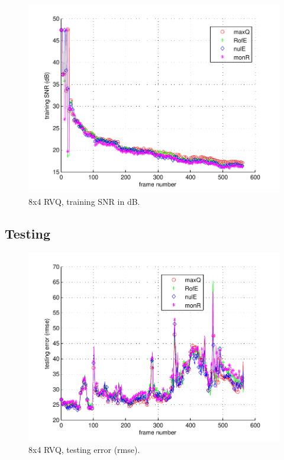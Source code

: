 								\begin{figure}[h!]
								\centering
								\includegraphics[height=0.4\textheight]{thesis/1_Dudek_8_4_1000_trg_SNRdB.pdf}
								\caption{8x4 RVQ, training SNR in dB.}
								\label{fig:1_Dudek_8_4_1000_trg_SNRdB}
								\end{figure}
\clearpage
\newpage
\subsection{Testing}
								\begin{figure}[h!]
								\centering
								\includegraphics[height=0.4\textheight]{thesis/1_Dudek_8_4_1000_tst_rmse.pdf}
								\caption{8x4 RVQ, testing error (rmse).}
								\label{fig:1_Dudek_8_4_1000_tst_rmse}
								\end{figure}


